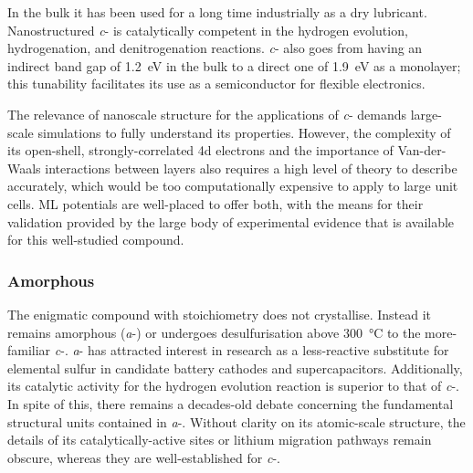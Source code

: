 \documentclass[12pt,a4paper,twoside,nobind]{ociamthesis}
\begin{document}
In the bulk it has been used for a long time industrially as a dry lubricant.\autocite{Winer1967}
Nanostructured \textit{c}- is catalytically competent in the hydrogen evolution, hydrogenation, and denitrogenation reactions.\autocite{Tye2006,Wu2013}
\textit{c}- also goes from having an indirect band gap of \SI{1.2}{eV} in the bulk to a direct one of \SI{1.9}{eV} as a monolayer; 
this tunability facilitates its use as a semiconductor for flexible electronics.\autocite{Ganatra2014} 

The relevance of nanoscale structure for the applications of \textit{c}- demands large-scale simulations to fully understand its properties. 
However, the complexity of its open-shell, strongly-correlated 4d electrons and the importance of Van-der-Waals interactions between 
layers also requires a high level of theory to describe accurately, 
which would be too computationally expensive to apply to large unit cells. 
ML potentials are well-placed to offer both, with the means for 
their validation provided by the large body of experimental evidence that is available for this well-studied compound.

\subsubsection*{Amorphous }

The enigmatic compound with stoichiometry  %
does not crystallise. Instead it remains amorphous (\textit{a}-) or undergoes desulfurisation above \SI{300}{\celsius} to the more-familiar \textit{c}-.
\textit{a}- has attracted interest in research as a less-reactive substitute for elemental sulfur in candidate battery cathodes\autocite{Ye2017} and supercapacitors.\autocite{Pazhamalai2019}
Additionally, its catalytic activity for the hydrogen evolution reaction is superior to that of \textit{c}-.\autocite{Merki2011} 
In spite of this, there remains a decades-old debate concerning the fundamental  structural units contained in \textit{a}-. 
Without clarity on its atomic-scale structure, the details of its catalytically-active sites or lithium migration pathways remain obscure,
whereas they are well-established for \textit{c}-.
\end{document}
